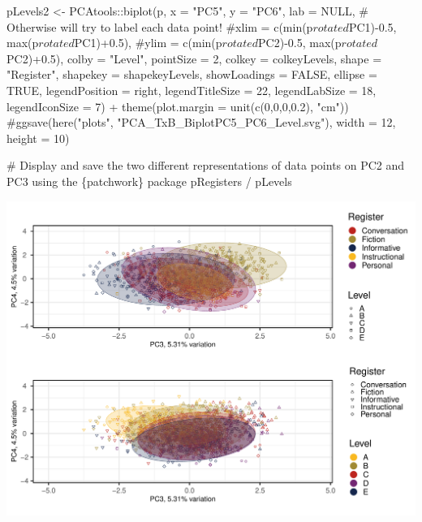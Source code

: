 \documentclass[
  letterpaper,
  DIV=11,
  numbers=noendperiod]{scrreprt}
\newenvironment{Shaded}{\begin{snugshade}}{\end{snugshade}}
\newcommand{\AttributeTok}[1]{\textcolor[rgb]{0.40,0.45,0.13}{#1}}
\newcommand{\CommentTok}[1]{\textcolor[rgb]{0.37,0.37,0.37}{#1}}
\newcommand{\ConstantTok}[1]{\textcolor[rgb]{0.56,0.35,0.01}{#1}}
\newcommand{\DecValTok}[1]{\textcolor[rgb]{0.68,0.00,0.00}{#1}}
\newcommand{\FloatTok}[1]{\textcolor[rgb]{0.68,0.00,0.00}{#1}}
\newcommand{\FunctionTok}[1]{\textcolor[rgb]{0.28,0.35,0.67}{#1}}
\newcommand{\NormalTok}[1]{\textcolor[rgb]{0.00,0.23,0.31}{#1}}
\newcommand{\OtherTok}[1]{\textcolor[rgb]{0.00,0.23,0.31}{#1}}
\newcommand{\SpecialCharTok}[1]{\textcolor[rgb]{0.37,0.37,0.37}{#1}}
\newcommand{\StringTok}[1]{\textcolor[rgb]{0.13,0.47,0.30}{#1}}
\begin{document}
\begin{Shaded}
\begin{Highlighting}[]
\NormalTok{pLevels2 }\OtherTok{\textless{}{-}}\NormalTok{ PCAtools}\SpecialCharTok{::}\FunctionTok{biplot}\NormalTok{(p,}
                 \AttributeTok{x =} \StringTok{"PC5"}\NormalTok{,}
                 \AttributeTok{y =} \StringTok{"PC6"}\NormalTok{,}
                 \AttributeTok{lab =} \ConstantTok{NULL}\NormalTok{, }\CommentTok{\# Otherwise will try to label each data point!}
                 \CommentTok{\#xlim = c(min(p$rotated$PC1){-}0.5, max(p$rotated$PC1)+0.5),}
                 \CommentTok{\#ylim = c(min(p$rotated$PC2){-}0.5, max(p$rotated$PC2)+0.5),}
                 \AttributeTok{colby =} \StringTok{"Level"}\NormalTok{,}
                 \AttributeTok{pointSize =} \DecValTok{2}\NormalTok{,}
                 \AttributeTok{colkey =}\NormalTok{ colkeyLevels,}
                 \AttributeTok{shape =} \StringTok{"Register"}\NormalTok{,}
                 \AttributeTok{shapekey =}\NormalTok{ shapekeyLevels,}
                 \AttributeTok{showLoadings =} \ConstantTok{FALSE}\NormalTok{,}
                 \AttributeTok{ellipse =} \ConstantTok{TRUE}\NormalTok{,}
                 \AttributeTok{legendPosition =} \StringTok{\textquotesingle{}right\textquotesingle{}}\NormalTok{,}
                 \AttributeTok{legendTitleSize =} \DecValTok{22}\NormalTok{,}
                 \AttributeTok{legendLabSize =} \DecValTok{18}\NormalTok{, }
                 \AttributeTok{legendIconSize =} \DecValTok{7}\NormalTok{) }\SpecialCharTok{+}
  \FunctionTok{theme}\NormalTok{(}\AttributeTok{plot.margin =} \FunctionTok{unit}\NormalTok{(}\FunctionTok{c}\NormalTok{(}\DecValTok{0}\NormalTok{,}\DecValTok{0}\NormalTok{,}\DecValTok{0}\NormalTok{,}\FloatTok{0.2}\NormalTok{), }\StringTok{"cm"}\NormalTok{))}
\CommentTok{\#ggsave(here("plots", "PCA\_TxB\_BiplotPC5\_PC6\_Level.svg"), width = 12, height = 10)}


\CommentTok{\# Display and save the two different representations of data points on PC2 and PC3 using the \{patchwork\} package}
\NormalTok{pRegisters }\SpecialCharTok{/}\NormalTok{ pLevels}
\end{Highlighting}
\end{Shaded}

\includegraphics{AppendixF_files/figure-pdf/PCAtools-biplots-TxB-Levels-1.pdf}
\end{document}
